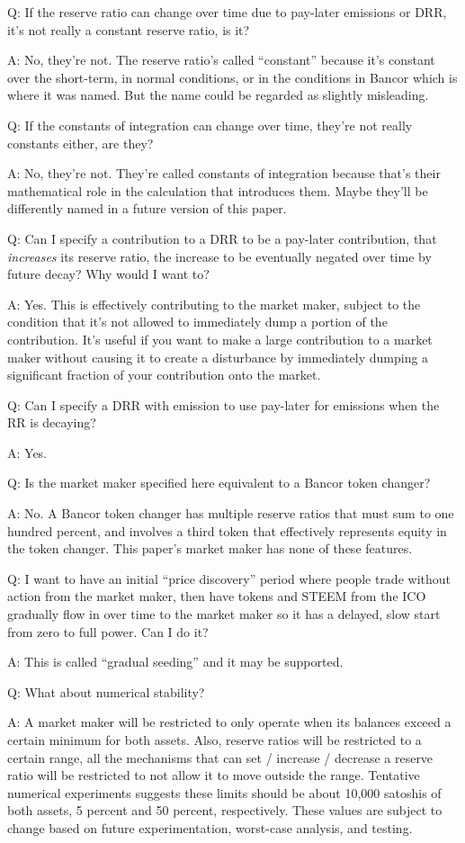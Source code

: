 \documentclass{article}
\begin{document}
Q:  If the reserve ratio can change over time due to pay-later emissions or DRR,
it's not really a constant reserve ratio, is it?

A:  No, they're not.  The reserve ratio's called ``constant'' because it's constant
over the short-term, in normal conditions, or in the conditions in Bancor which is
where it was named.  But the name could be regarded as slightly misleading.

Q:  If the constants of integration can change over time, they're not really
constants either, are they?

A:  No, they're not.  They're called constants of integration because that's their
mathematical role in the calculation that introduces them.  Maybe they'll be
differently named in a future version of this paper.

Q:  Can I specify a contribution to a DRR to be a pay-later contribution, that
\textit{increases} its reserve ratio, the increase to be eventually negated over
time by future decay?  Why would I want to?

A:  Yes.  This is effectively contributing to the market maker,
subject to the condition that it's not allowed to immediately dump a portion
of the contribution.  It's useful if you want to make a large contribution
to a market maker without causing it to create a disturbance by immediately
dumping a significant fraction of your contribution onto the market.

Q:  Can I specify a DRR with emission to use pay-later for emissions when the
RR is decaying?

A:  Yes.

Q:  Is the market maker specified here equivalent to a Bancor token changer?

A:  No.  A Bancor token changer has multiple reserve ratios that must sum to
one hundred percent, and involves a third token that effectively represents
equity in the token changer.  This paper's market maker has none of these
features.

Q:  I want to have an initial ``price discovery'' period where people trade
without action from the market maker, then have tokens and STEEM from
the ICO gradually flow in over time to the market maker so it has a delayed,
slow start from zero to full power.  Can I do it?

A:  This is called ``gradual seeding'' and it may be supported.

Q:  What about numerical stability?

A:  A market maker will be restricted to only operate when its
balances exceed a certain minimum for both assets.  Also, reserve
ratios will be restricted to a certain range, all the mechanisms
that can set / increase / decrease a reserve ratio will be restricted
to not allow it to move outside the range.  Tentative numerical
experiments suggests these limits should be about 10,000 satoshis
of both assets, 5 percent and 50 percent, respectively.  These
values are subject to change based on future experimentation,
worst-case analysis, and testing.
\end{document}
